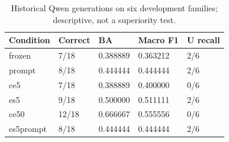 \begin{table}[t]
\centering\small
\caption{Historical Qwen generations on six development families; descriptive, not a superiority test.}
\label{tab:t3_qwen_behavior}
\begin{tabularx}{\linewidth}{lXXXX}
\toprule
Condition & Correct & BA & Macro F1 & U recall \\ \midrule
frozen & 7/18 & 0.388889 & 0.363212 & 2/6 \\
prompt & 8/18 & 0.444444 & 0.444444 & 2/6 \\
ce5 & 7/18 & 0.388889 & 0.400000 & 0/6 \\
es5 & 9/18 & 0.500000 & 0.511111 & 2/6 \\
ce50 & 12/18 & 0.666667 & 0.555556 & 0/6 \\
es5prompt & 8/18 & 0.444444 & 0.444444 & 2/6 \\
\bottomrule
\end{tabularx}
\end{table}
